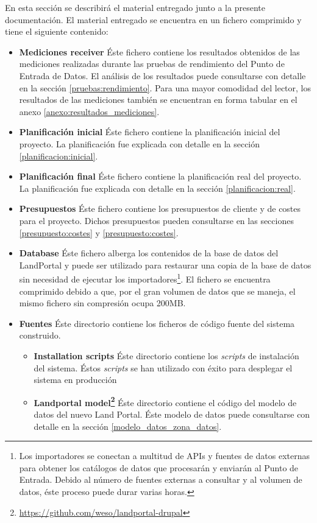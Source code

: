 En esta sección se describirá el material entregado junto a la presente documentación.  El material entregado se encuentra en un fichero comprimido y tiene el siguiente contenido:
\begin{itemize}
	\item \textbf{Mediciones receiver}  Éste fichero contiene los resultados obtenidos de las mediciones realizadas durante las pruebas de rendimiento del Punto de Entrada de Datos.  El análisis de los resultados puede consultarse con detalle en la sección \ref{pruebas:rendimiento}.  Para una mayor comodidad del lector, los resultados de las mediciones también se encuentran en forma tabular en el anexo \ref{anexo:resultados_mediciones}.
	\item \textbf{Planificación inicial}  Éste fichero contiene la planificación inicial del proyecto.  La planificación fue explicada con detalle en la sección \ref{planificacion:inicial}.
	\item \textbf{Planificación final}  Éste fichero contiene la planificación real del proyecto.  La planificación fue explicada con detalle en la sección \ref{planificacion:real}.
	\item \textbf{Presupuestos}  Éste fichero contiene los presupuestos de cliente y de costes para el proyecto.  Dichos presupuestos pueden consultarse en las secciones \ref{presupuesto:costes} y \ref{presupuesto:costes}.
	\item \textbf{Database}  Éste fichero alberga los contenidos de la base de datos del LandPortal y puede ser utilizado para restaurar una copia de la base de datos sin necesidad de ejecutar los importadores\footnote{Los importadores se conectan a multitud de APIs y fuentes de datos externas para obtener los catálogos de datos que procesarán y enviarán al Punto de Entrada.  Debido al número de fuentes externas a consultar y al volumen de datos, éste proceso puede durar varias horas.}.  El fichero se encuentra comprimido debido a que, por el gran volumen de datos que se maneja, el mismo fichero sin compresión ocupa 200MB.
	\item \textbf{Fuentes}  Éste directorio contiene los ficheros de código fuente del sistema construido.
		\begin{itemize}
			\item \textbf{Installation scripts}  Éste directorio contiene los \textit{scripts} de instalación del sistema.  Éstos \textit{scripts} se han utilizado con éxito para desplegar el sistema en producción
			\item \textbf{Landportal model\footnote{\url{https://github.com/weso/landportal-drupal}}}  Éste directorio contiene el código del modelo de datos del nuevo Land Portal.  Éste modelo de datos puede consultarse con detalle en la sección \ref{modelo_datos_zona_datos}.

\end{itemize}
\end{itemize}

